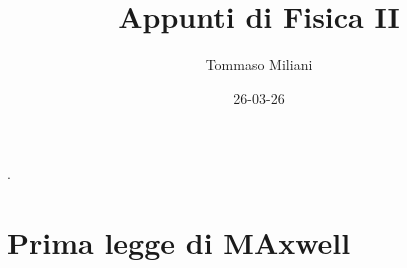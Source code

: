 \documentclass[a4paper, oneside]{article}
\title{Appunti di Fisica II}
\author{Tommaso Miliani}
\date{26-03-26}
\begin{document}
                {}          %
                {}          %
                {\slshape}  %
                {}          %
                {\bfseries} %
                {.}         %
                {\newline}  %
                {}          %
\theoremstyle{theoremEnv}

\newtheorem{definition}{Definizione}[section]
\newtheorem{theorem}{Teorema}[section]
\newtheorem{lemma}{Proposizione}[section]
\newtheorem{observation}{Osservazione}[section]
\newtheorem{corollary}{Corollario}[theorem]
\newtheorem{example}{Esempio}[section]
\newtheorem{remark}{Enunciato}[section]

\maketitle

\section{Prima legge di MAxwell}
\end{document}
